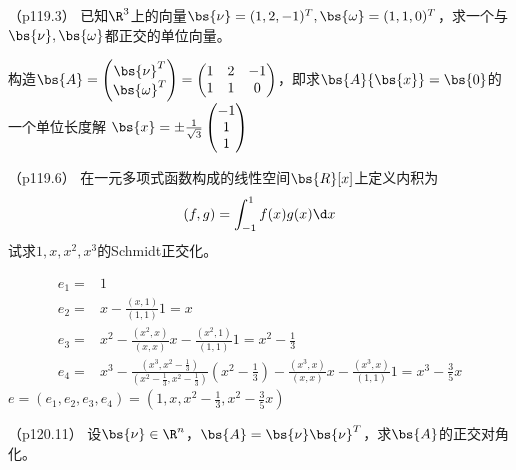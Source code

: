 \documentclass[12pt, a4paper, oneside, UTF8]{ctexbook}
\begin{document}
\begin{question}（p119.3）
    已知$\R^3$上的向量$\bs{\nu}=(1,2,-1)^T,\bs{\omega}=(1,1,0)^T$，求一个与$\bs{\nu},\bs{\omega}$都正交的单位向量。
\end{question}


\begin{solution}
    构造$\bs{A}=\begin{pmatrix}
        \bs{\nu}^T\\
        \bs{\omega}^T
    \end{pmatrix}=\begin{pmatrix}
        1 & 2 & -1\\
        1 & 1 & 0
    \end{pmatrix}$，即求$\bs{A}{\bs{x}}=\bs{0}$的一个单位长度解
    $\bs{x}=\pm \frac{1}{\sqrt{3}}\begin{pmatrix}
        -1 \\
        1 \\
        1
    \end{pmatrix}$
\end{solution}


\begin{question}（p119.6）
    在一元多项式函数构成的线性空间$\bs{R}[x]$上定义内积为
    \begin{align*}
        (f,g)=\int_{-1}^1 f(x)g(x) \d x
    \end{align*}
    试求$1,x,x^2,x^3$的Schmidt正交化。
\end{question}

\begin{solution}
    \begin{align*}
        e_1=&1 \\
        e_2=&x-\frac{(x,1)}{(1,1)} 1 =x \\
        e_3=&x^2-\frac{(x^2,x)}{(x,x)}x-\frac{(x^2,1)}{(1,1)} 1=x^2-\frac{1}{3} \\
        e_4=&x^3-\frac{(x^3,x^2-\frac{1}{3})}{(x^2-\frac{1}{3},x^2-\frac{1}{3})}(x^2-\frac{1}{3})-
        \frac{(x^3,x)}{(x,x)}x-\frac{(x^3,x)}{(1,1)}1=x^3-\frac{3}{5}x
    \end{align*}
    $e=(e_1,e_2,e_3,e_4)=(1,x,x^2-\frac{1}{3},x^2-\frac{3}{5}x)$
\end{solution}

\begin{question}（p120.11）
    设$\bs{\nu}\in \R^n$，$\bs{A}=\bs{\nu}\bs{\nu}^T$，求$\bs{A}$的正交对角化。
\end{question}
\end{document}
